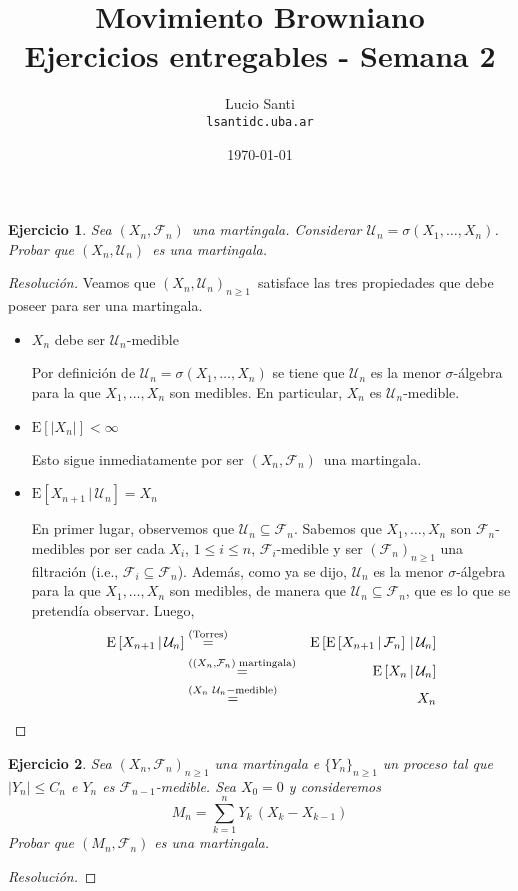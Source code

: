 \documentclass[a4paper,11pt]{article}
\title{Movimiento Browniano\\
      \small{Ejercicios entregables - Semana 2}}
\author{Lucio Santi\\
        \texttt{lsanti\at dc.uba.ar}}
\date{\today}
\newcommand{\abs}[1]{\ensuremath{\left\lvert #1 \right\rvert}}
\newcommand{\Sig}[1]{\ensuremath{\mathcal{#1}}}
\newcommand{\SigAlg}[1]{\ensuremath{\sigma\left(#1\right)}}
\newcommand{\Mart}[2]{\ensuremath{\left(#1_n, \Sig{#2}_n\right)}}
\newcommand{\Exp}[1]{\ensuremath{\textrm{E}\left[#1\right]}}
\newcommand{\ExpC}[2]{\ensuremath{\textrm{E}\left[#1 \, | \, #2\right]}}
\newtheorem*{ej}{Ejercicio}
\begin{document}
\maketitle

\begin{ej} 
    Sea \Mart{X}{F}~una martingala. Considerar $\Sig{U}_n = \SigAlg{X_1, \dots, X_n}$.
    Probar que \Mart{X}{U}~es una martingala.
\end{ej}

\begin{proof}[Resoluci\'on]
Veamos que $\Mart{X}{U}_{n \geq 1}$~satisface las tres propiedades que debe poseer
para ser una martingala. 

\begin{itemize}
    \item $X_n$ debe ser $\Sig{U}_n$-medible

    Por definición de $\Sig{U}_n = \SigAlg{X_1, \dots, X_n}$ se tiene que $\Sig{U}_n$
    es la menor $\sigma$-álgebra para la que $X_1,\dots,X_n$ son medibles. En
    particular, $X_n$ es $\Sig{U}_n$-medible.

    \item $\Exp{\abs{X_n}} < \infty$

    Esto sigue inmediatamente por ser \Mart{X}{F}~una martingala.

    \item $\ExpC{X_{n+1}}{\Sig{U}_n} = X_n$

    En primer lugar, observemos que $\Sig{U}_n \subseteq \Sig{F}_n$. Sabemos que
    $X_1,\dots,X_n$ son $\Sig{F}_n$-medibles por ser cada $X_i$, $1 \leq i \leq n$,
    $\Sig{F}_i$-medible y ser $(\Sig{F}_n)_{n \geq 1}$ una filtración (i.e.,
    $\Sig{F}_i \subseteq \Sig{F}_n$). Además, como ya se dijo, $\Sig{U}_n$ es la
    menor $\sigma$-álgebra para la que $X_1,\dots,X_n$ son medibles, de manera que
    $\Sig{U}_n \subseteq \Sig{F}_n$, que es lo que se pretendía observar. Luego,
    \begin{eqnarray*}
        \ExpC{X_{n+1}}{\Sig{U}_n} &\overset{\tiny{\textrm{(Torres)}}}{=}&
            \ExpC{ \ExpC{X_{n+1}}{\Sig{F}_n} }{\Sig{U}_n} \\
        &\overset{\tiny{(\Mart{X}{F}~\textrm{martingala})}}{=}&
            \ExpC{X_n}{\Sig{U}_n} \\
        &\overset{\tiny{(X_n \,\, \Sig{U}_n-\textrm{medible}})}{=}&
            X_n
    \end{eqnarray*}
\end{itemize}

\end{proof}


\begin{ej}
    Sea $(X_n, \Sig{F}_n)_{n \geq 1}$ una martingala e $\{Y_n\}_{n \geq 1}$ un proceso tal
    que $\abs{Y_n} \leq C_n$ e $Y_n$ es $\Sig{F}_{n−1}$-medible. Sea $X_0 = 0$ y consideremos
    $$M_n = \displaystyle \sum_{k = 1}^{n}{Y_k \, (X_k − X_{k−1})}$$
    Probar que $(M_n, \Sig{F}_n)$ es una martingala. 
\end{ej}

\begin{proof}[Resoluci\'on]

\end{proof}
\end{document}
